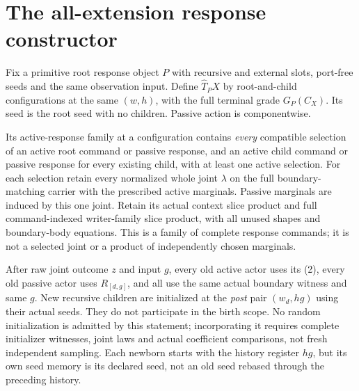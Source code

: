 \documentclass[11pt]{article}
\begin{document}
\section{The all-extension response constructor}
Fix a primitive root response object $P$ with recursive and external slots, port-free seeds and the same observation input. Define $\widehat T_PX$ by root-and-child configurations at the same $(w,h)$, with the full terminal grade $G_P(C_X)$. Its seed is the root seed with no children. Passive action is componentwise.

Its active-response family at a configuration contains \emph{every} compatible selection of an active root command or passive response, and an active child command or passive response for every existing child, with at least one active selection. For each selection retain every normalized whole joint $\lambda$ on the full boundary-matching carrier with the prescribed active marginals. Passive marginals are induced by this one joint. Retain its actual context slice product and full command-indexed writer-family slice product, with all unused shapes and boundary-body equations. This is a family of complete response commands; it is not a selected joint or a product of independently chosen marginals.

After raw joint outcome $z$ and input $g$, every old active actor uses its (2), every old passive actor uses $R_{[d,g]}$, and all use the same actual boundary witness and same $g$. New recursive children are initialized at the \emph{post} pair $(w_d,hg)$ using their actual seeds. They do not participate in the birth scope. No random initialization is admitted by this statement; incorporating it requires complete initializer witnesses, joint laws and actual coefficient comparisons, not fresh independent sampling. Each newborn starts with the history register $hg$, but its own seed memory is its declared seed, not an old seed rebased through the preceding history.
\end{document}
